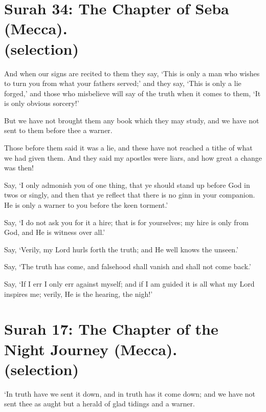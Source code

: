 \documentclass[fontsize=14pt, letterpaper, notitlepage, openany, DIV=12]{scrbook} %
\begin{document}
\section[Surah 34: The Chapter of Seba (Mecca).]{Surah 34: The Chapter of Seba (Mecca).\\ (selection)}


\noindent[34:43]
And when our signs are recited to them they say, `This is only a man who wishes to turn
you from what your fathers served;' and they say, `This is only a lie forged,' and those who
misbelieve will say of the truth when it comes to them, `It is only obvious sorcery!'

\noindent[34:44]
But we have not brought them any book which they may study, and we have not sent to
them before thee a warner.

\noindent[34:45]
Those before them said it was a lie, and these have not reached a tithe of what we had
given them. And they said my apostles were liars, and how great a change was then!

\noindent[34:46]
Say, `I only admonish you of one thing, that ye should stand up before God in twos or
singly, and then that ye reflect that there is no ginn in your companion. He is only a warner to
you before the keen torment.'

\noindent[34:47]
Say, `I do not ask you for it a hire; that is for yourselves; my hire is only from God, and
He is witness over all.'

\noindent[34:48]
Say, `Verily, my Lord hurls forth the truth; and He well knows the unseen.'

\noindent[34:49]
Say, `The truth has come, and falsehood shall vanish and shall not come back.'

\noindent[34:50]
Say, `If I err I only err against myself; and if I am guided it is all what my Lord inspires
me; verily, He is the hearing, the nigh!'


\section[Surah 17: The Chapter of the Night Journey (Mecca).]{Surah 17: The Chapter of the Night Journey (Mecca).\\ (selection)}


\noindent[17:105]
`In truth have we sent it down, and in truth has it come down; and we have not sent thee
as aught but a herald of glad tidings and a warner.
\end{document}
